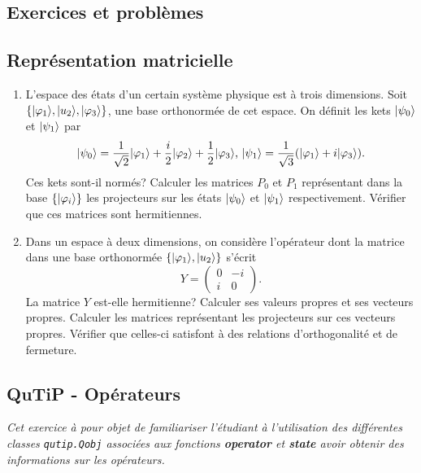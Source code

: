 \begin{itemize}
\section{Exercices et problèmes}

\subsection{Représentation matricielle}

\begin{enumerate}
\item L'espace des états d'un certain système physique est à trois dimensions.
Soit $\{\vert\varphi_1\rangle, \vert u_{2}\rangle, \vert\varphi_3\rangle\}$, une base
orthonormée de cet espace. On définit les kets $\vert\psi_{0}\rangle$ et
$\vert\psi_1\rangle$ par
\begin{equation}
\vert\psi_{0}\rangle=\frac{1}{\sqrt{2}}\vert\varphi_1\rangle+\frac{i}{2}\vert\varphi_{2}\rangle
+\frac{1}{2}\vert\varphi_3\rangle \text{, }\vert\psi_1\rangle=\frac{1}{\sqrt{3}}(
\vert\varphi_1\rangle+i\vert\varphi_3\rangle).
\end{equation}
Ces kets sont-il normés? Calculer les matrices $P_{0}$ et $P_1$ représentant
dans la base $\{\vert\varphi_{i}\rangle\}$ les projecteurs sur les états
$\vert\psi_{0}\rangle$ et $\vert\psi_1\rangle$ respectivement. Vérifier que ces matrices
sont hermitiennes.

\item Dans un espace à deux dimensions, on considère l'opérateur dont la
matrice dans une base orthonormée $\{\vert\varphi_1\rangle,\vert u_{2}\rangle\}$ s'écrit
\begin{equation}
Y=\begin{pmatrix}
0 & -i\\
i & 0
\end{pmatrix}.
\end{equation}
La matrice $Y$ est-elle hermitienne? Calculer ses valeurs propres et ses
vecteurs propres. Calculer les matrices représentant les projecteurs sur ces
vecteurs propres. Vérifier que celles-ci satisfont à des relations
d'orthogonalité et de fermeture.

\end{enumerate}

\subsection{QuTiP - Opérateurs}

\emph{Cet exercice à pour objet de familiariser l'étudiant à l'utilisation des
différentes classes \texttt{qutip.Qobj} associées aux fonctions 
\textbf{operator} et \textbf{state} avoir obtenir des informations sur les
opérateurs.}


\end{itemize}
